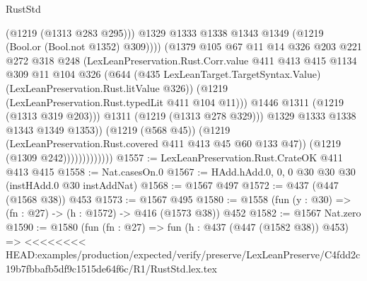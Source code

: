 \begin{lexlean}{RustStd}
\begin{coremodule}
{\begin{coremodule}
{{{{{{                                      (@1219 (@1313 @283 @295)))
                                    @1329
                                    @1333
                                    @1338
                                    @1343
                                    @1349
                                    (@1219 (Bool.or (Bool.not @1352) @309))))
                                (@1379
                                  @105
                                  @67
                                  @11
                                  @14
                                  @326
                                  @203
                                  @221
                                  @272
                                  @318
                                  @248
                                  (LexLeanPreservation.Rust.Corr.value
                                    @411
                                    @413
                                    @415
                                    @1134
                                    @309
                                    @11
                                    @104
                                    @326
                                    (@644
                                      (@435 LexLeanTarget.TargetSyntax.Value)
                                      (LexLeanPreservation.Rust.litValue @326))
                                    (@1219 (LexLeanPreservation.Rust.typedLit @411 @104 @11)))
                                  @1446
                                  @1311
                                  (@1219 (@1313 @319 @203)))
                                @1311
                                (@1219 (@1313 @278 @329)))
                              @1329
                              @1333
                              @1338
                              @1343
                              @1349
                              @1353))
                          (@1219 (@568 @45))
                          (@1219 (LexLeanPreservation.Rust.covered @411 @413 @45 @60 @133 @47))
                          (@1219 (@1309 @242)))))))))))))
@1557 := LexLeanPreservation.Rust.CrateOK @411 @413 @415
@1558 := Nat.casesOn.{0}
@1567 := HAdd.hAdd.{0, 0, 0} @30 @30 @30 (instHAdd.{0} @30 instAddNat)
@1568 := @1567 @497
@1572 := @437 (@447 (@1568 @38)) @453
@1573 := @1567 @495
@1580 := @1558 (fun (y : @30) => (fn : @27) -> (h : @1572) -> @416 (@1573 @38)) @452
@1582 := @1567 Nat.zero
@1590 := @1580
    (fun (fn : @27) =>
    fun (h : @437 (@447 (@1582 @38)) @453) =>
<<<<<<<< HEAD:examples/production/expected/verify/preserve/LexLeanPreserve/C4fdd2c19b7fbbafb5df9c1515de64f6c/R1/RustStd.lex.tex
}}}}}}
\end{coremodule}}
\end{coremodule}
\end{lexlean}
